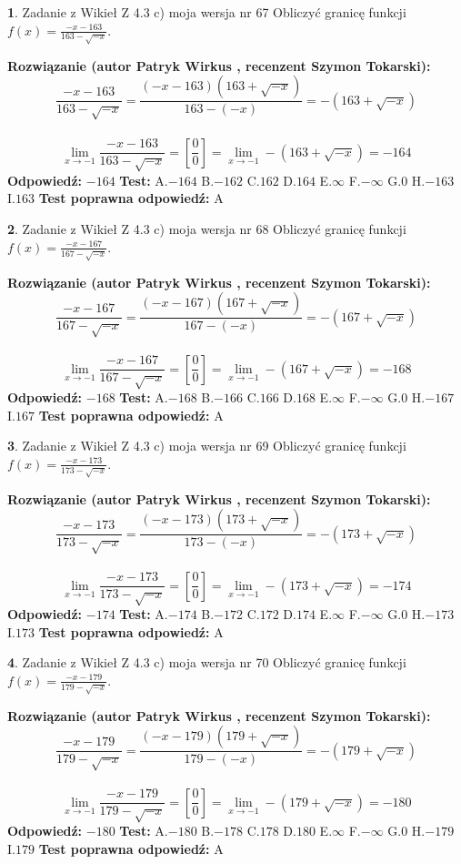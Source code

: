 \documentclass[12pt, a4paper]{article}
\theoremstyle{definition} %
\newtheorem{zad}{}
\newcommand{\zadStart}[1]{\begin{zad}#1\newline}
\newcommand{\zadStop}{\end{zad}}
\newcommand{\rozwStart}[2]{\noindent \textbf{Rozwiązanie (autor #1 , recenzent #2): }\newline}
\newcommand{\rozwStop}{\newline}
\newcommand{\odpStart}{\noindent \textbf{Odpowiedź:}\newline}
\newcommand{\odpStop}{\newline}
\newcommand{\testStart}{\noindent \textbf{Test:}\newline}
\newcommand{\testStop}{\newline}
\newcommand{\kluczStart}{\noindent \textbf{Test poprawna odpowiedź:}\newline}
\newcommand{\kluczStop}{\newline}
\begin{document}
\zadStart{Zadanie z Wikieł Z 4.3 c) moja wersja nr 67}
Obliczyć granicę funkcji $f(x)=\frac{-x-163}{163-\sqrt{-x}}$.
\zadStop
\rozwStart{Patryk Wirkus}{Szymon Tokarski}
$$\frac{-x-163}{163-\sqrt{-x}}=\frac{(-x-163)(163+\sqrt{-x})}{163-(-x)}=-(163+\sqrt{-x})$$
\\
$$\lim\limits_{x\to-1}\frac{-x-163}{163-\sqrt{-x}}=[\frac{0}{0}]=\lim\limits_{x\to-1}-(163+\sqrt{-x}) =-164$$
\rozwStop
\odpStart
$-164$
\odpStop
\testStart
A.$-164$
B.$-162$
C.$162$
D.$164$
E.$\infty$
F.$-\infty$
G.$0$
H.$-163$
I.$163$
\testStop
\kluczStart
A
\kluczStop



\zadStart{Zadanie z Wikieł Z 4.3 c) moja wersja nr 68}
Obliczyć granicę funkcji $f(x)=\frac{-x-167}{167-\sqrt{-x}}$.
\zadStop
\rozwStart{Patryk Wirkus}{Szymon Tokarski}
$$\frac{-x-167}{167-\sqrt{-x}}=\frac{(-x-167)(167+\sqrt{-x})}{167-(-x)}=-(167+\sqrt{-x})$$
\\
$$\lim\limits_{x\to-1}\frac{-x-167}{167-\sqrt{-x}}=[\frac{0}{0}]=\lim\limits_{x\to-1}-(167+\sqrt{-x}) =-168$$
\rozwStop
\odpStart
$-168$
\odpStop
\testStart
A.$-168$
B.$-166$
C.$166$
D.$168$
E.$\infty$
F.$-\infty$
G.$0$
H.$-167$
I.$167$
\testStop
\kluczStart
A
\kluczStop



\zadStart{Zadanie z Wikieł Z 4.3 c) moja wersja nr 69}
Obliczyć granicę funkcji $f(x)=\frac{-x-173}{173-\sqrt{-x}}$.
\zadStop
\rozwStart{Patryk Wirkus}{Szymon Tokarski}
$$\frac{-x-173}{173-\sqrt{-x}}=\frac{(-x-173)(173+\sqrt{-x})}{173-(-x)}=-(173+\sqrt{-x})$$
\\
$$\lim\limits_{x\to-1}\frac{-x-173}{173-\sqrt{-x}}=[\frac{0}{0}]=\lim\limits_{x\to-1}-(173+\sqrt{-x}) =-174$$
\rozwStop
\odpStart
$-174$
\odpStop
\testStart
A.$-174$
B.$-172$
C.$172$
D.$174$
E.$\infty$
F.$-\infty$
G.$0$
H.$-173$
I.$173$
\testStop
\kluczStart
A
\kluczStop



\zadStart{Zadanie z Wikieł Z 4.3 c) moja wersja nr 70}
Obliczyć granicę funkcji $f(x)=\frac{-x-179}{179-\sqrt{-x}}$.
\zadStop
\rozwStart{Patryk Wirkus}{Szymon Tokarski}
$$\frac{-x-179}{179-\sqrt{-x}}=\frac{(-x-179)(179+\sqrt{-x})}{179-(-x)}=-(179+\sqrt{-x})$$
\\
$$\lim\limits_{x\to-1}\frac{-x-179}{179-\sqrt{-x}}=[\frac{0}{0}]=\lim\limits_{x\to-1}-(179+\sqrt{-x}) =-180$$
\rozwStop
\odpStart
$-180$
\odpStop
\testStart
A.$-180$
B.$-178$
C.$178$
D.$180$
E.$\infty$
F.$-\infty$
G.$0$
H.$-179$
I.$179$
\testStop
\kluczStart
A
\kluczStop
\end{document}

